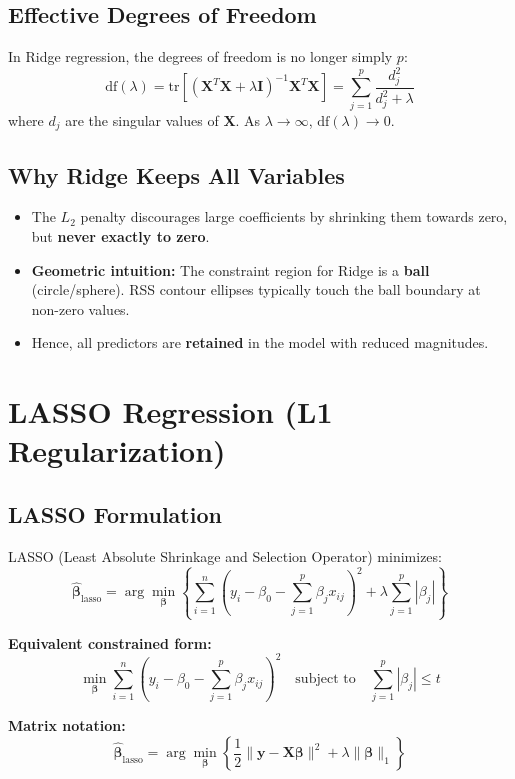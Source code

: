 \documentclass{article}
\begin{document}
\subsection{Effective Degrees of Freedom}
In Ridge regression, the degrees of freedom is no longer simply $p$:
$$\text{df}(\lambda) = \text{tr}\left[(\mathbf{X}^T\mathbf{X} + \lambda\mathbf{I})^{-1}\mathbf{X}^T\mathbf{X}\right] = \sum_{j=1}^{p} \frac{d_j^2}{d_j^2 + \lambda}$$
where $d_j$ are the singular values of $\mathbf{X}$. As $\lambda \to \infty$, $\text{df}(\lambda) \to 0$.

\subsection{Why Ridge Keeps All Variables}
\begin{itemize}
    \item The $L_2$ penalty discourages large coefficients by shrinking them towards zero, but \textbf{never exactly to zero}.
    \item \textbf{Geometric intuition:} The constraint region for Ridge is a \textbf{ball} (circle/sphere). RSS contour ellipses typically touch the ball boundary at non-zero values.
    \item Hence, all predictors are \textbf{retained} in the model with reduced magnitudes.
\end{itemize}

\newpage
\section{LASSO Regression (L1 Regularization)}

\subsection{LASSO Formulation}
LASSO (Least Absolute Shrinkage and Selection Operator) minimizes:
$$\hat{\boldsymbol{\beta}}_{\text{lasso}} = \arg\min_{\boldsymbol{\beta}} \left\{ \sum_{i=1}^{n} \left( y_i - \beta_0 - \sum_{j=1}^{p} \beta_j x_{ij} \right)^2 + \lambda \sum_{j=1}^{p} |\beta_j| \right\}$$

\noindent\textbf{Equivalent constrained form:}
$$\min_{\boldsymbol{\beta}} \sum_{i=1}^{n} \left( y_i - \beta_0 - \sum_{j=1}^{p} \beta_j x_{ij} \right)^2 \quad \text{subject to} \quad \sum_{j=1}^{p} |\beta_j| \le t$$

\noindent\textbf{Matrix notation:}
$$\hat{\boldsymbol{\beta}}_{\text{lasso}} = \arg\min_{\boldsymbol{\beta}} \left\{ \frac{1}{2} \|\mathbf{y} - \mathbf{X}\boldsymbol{\beta}\|^2 + \lambda \|\boldsymbol{\beta}\|_1 \right\}$$
\end{document}
